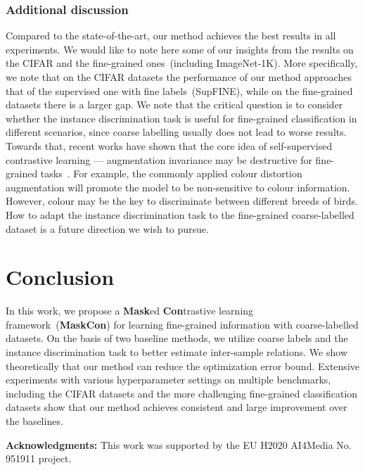 \documentclass[10pt,twocolumn,letterpaper]{article}
\begin{document}
\subsubsection{Additional discussion}
Compared to the state-of-the-art, our method achieves the best results in all experiments. We would like to note here some of our insights from the results on the CIFAR and the fine-grained ones~(including ImageNet-1K). More specifically, we note that on the CIFAR datasets the performance of our method approaches that of the supervised one with fine labels~(SupFINE), while on the fine-grained datasets there is a larger gap.
We note that the critical question is to consider whether the instance discrimination task is useful for fine-grained classification in different scenarios, since coarse labelling usually does not lead to worse results.
Towards that, recent works have shown that the core idea of self-supervised contrastive learning --- augmentation invariance may be destructive for fine-grained tasks~\cite{xiao2020whatdoesnt_finegrained1, cole2022whendoes_finegrained2}. For example, the commonly applied colour distortion augmentation will promote the model to be non-sensitive to colour information. However, colour may be the key to discriminate between different breeds of birds. How to adapt the instance discrimination task to the fine-grained coarse-labelled dataset is a future direction we wish to pursue.






\section{Conclusion}
In this work, we propose a \textbf{Mask}ed \textbf{Con}trastive learning framework~(\textbf{MaskCon}) for learning fine-grained information with coarse-labelled datasets. On the basis of two baseline methods, we utilize coarse labels and the instance discrimination task to better estimate inter-sample relations. We show theoretically that our method can reduce the optimization error bound. Extensive experiments with various hyperparameter settings on multiple benchmarks, including the CIFAR datasets and the more challenging fine-grained classification datasets  show that our method achieves consistent and large improvement over the baselines. 

{\setlength{\parindent}{0.0cm}
\textbf{Acknowledgments:} This work was supported by the EU H2020 AI4Media No. 951911 project.
} 


{\small


}
\onecolumn
\appendix
\end{document}
